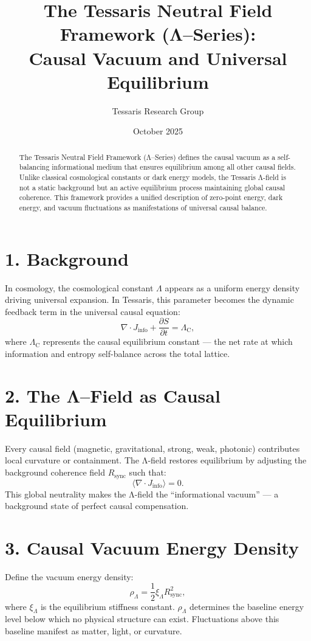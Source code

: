 \documentclass[11pt,a4paper]{article}
\title{\textbf{The Tessaris Neutral Field Framework (Λ–Series):\\Causal Vacuum and Universal Equilibrium}}
\author{Tessaris Research Group}
\date{October 2025}
\begin{document}
\maketitle

\begin{abstract}
The Tessaris Neutral Field Framework (Λ–Series) defines the causal vacuum as a self-balancing informational medium that ensures equilibrium among all other causal fields.  
Unlike classical cosmological constants or dark energy models, the Tessaris Λ-field is not a static background but an active equilibrium process maintaining global causal coherence.  
This framework provides a unified description of zero-point energy, dark energy, and vacuum fluctuations as manifestations of universal causal balance.
\end{abstract}

\section{1. Background}
In cosmology, the cosmological constant $\Lambda$ appears as a uniform energy density driving universal expansion.  
In Tessaris, this parameter becomes the dynamic feedback term in the universal causal equation:
\[
\nabla\!\cdot\!J_{\mathrm{info}} + \frac{\partial S}{\partial t} = \Lambda_\mathrm{C},
\]
where $\Lambda_\mathrm{C}$ represents the causal equilibrium constant — the net rate at which information and entropy self-balance across the total lattice.

\section{2. The Λ–Field as Causal Equilibrium}
Every causal field (magnetic, gravitational, strong, weak, photonic) contributes local curvature or containment.  
The Λ-field restores equilibrium by adjusting the background coherence field $R_{\mathrm{sync}}$ such that:
\[
\langle \nabla\!\cdot\!J_{\mathrm{info}} \rangle = 0.
\]
This global neutrality makes the Λ-field the “informational vacuum” — a background state of perfect causal compensation.

\section{3. Causal Vacuum Energy Density}
Define the vacuum energy density:
\[
\rho_\Lambda = \frac{1}{2} \xi_\Lambda R_{\mathrm{sync}}^2,
\]
where $\xi_\Lambda$ is the equilibrium stiffness constant.  
$\rho_\Lambda$ determines the baseline energy level below which no physical structure can exist.  
Fluctuations above this baseline manifest as matter, light, or curvature.
\end{document}
